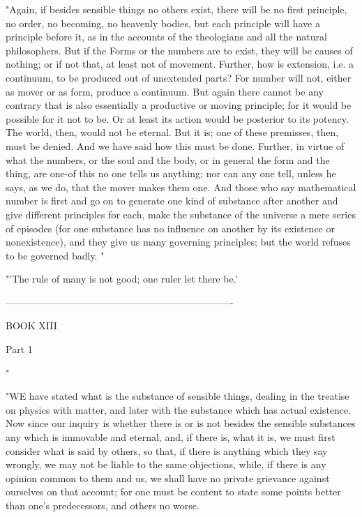 "Again, if besides sensible things no others exist, there will be
no first principle, no order, no becoming, no heavenly bodies, but
each principle will have a principle before it, as in the accounts
of the theologians and all the natural philosophers. But if the Forms
or the numbers are to exist, they will be causes of nothing; or if
not that, at least not of movement. Further, how is extension, i.e.
a continuum, to be produced out of unextended parts? For number will
not, either as mover or as form, produce a continuum. But again there
cannot be any contrary that is also essentially a productive or moving
principle; for it would be possible for it not to be. Or at least
its action would be posterior to its potency. The world, then, would
not be eternal. But it is; one of these premisses, then, must be denied.
And we have said how this must be done. Further, in virtue of what
the numbers, or the soul and the body, or in general the form and
the thing, are one-of this no one tells us anything; nor can any one
tell, unless he says, as we do, that the mover makes them one. And
those who say mathematical number is first and go on to generate one
kind of substance after another and give different principles for
each, make the substance of the universe a mere series of episodes
(for one substance has no influence on another by its existence or
nonexistence), and they give us many governing principles; but the
world refuses to be governed badly. "

"'The rule of many is not good; one ruler let there be.'

----------------------------------------------------------------------

BOOK XIII

Part 1 

"

"WE have stated what is the substance of sensible things, dealing
in the treatise on physics with matter, and later with the substance
which has actual existence. Now since our inquiry is whether there
is or is not besides the sensible substances any which is immovable
and eternal, and, if there is, what it is, we must first consider
what is said by others, so that, if there is anything which they say
wrongly, we may not be liable to the same objections, while, if there
is any opinion common to them and us, we shall have no private grievance
against ourselves on that account; for one must be content to state
some points better than one's predecessors, and others no worse.

